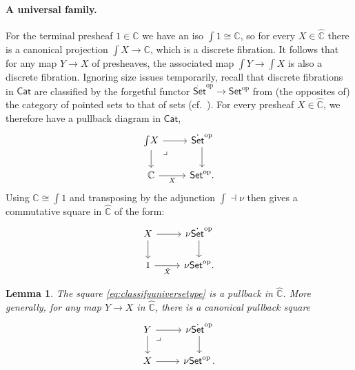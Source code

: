 \documentclass[12pt]{article}
\newcommand{\bbC}{\ensuremath{\mathbb{C}}}
\newcommand{\Set}{\ensuremath{\mathsf{Set}}}
\newcommand{\Cat}{\ensuremath{\mathsf{Cat}}}
\newcommand{\op}[1]{\ensuremath{{#1}^{\mathrm{op}}}}
\newcommand{\ra}{\ensuremath{\rightarrow}}
\renewcommand{\to}{\ensuremath{\rightarrow}}
\newcommand{\elem}[1]{\textstyle\int\!{#1}}
\newtheorem{lemma}[theorem]{Lemma}
\theoremstyle{remark}
\theoremstyle{definition}
\newcommand{\pbmark}{\ar[dr, phantom, "\lrcorner" very near start, shift right=.5ex]}	%
\begin{document}
\paragraph{A universal family.}

For the terminal presheaf $1\in\widehat{\bbC}$ we have an iso $\elem{1} \cong\bbC$, so for every $X\in\widehat{\bbC}$ there is a canonical projection  $\elem X \ra\bbC$, which is a discrete fibration.  It follows that for any map $Y\to X$ of presheaves, the associated map $\elem Y \to \elem X$ is also a discrete fibration. 
Ignoring size issues temporarily, recall that discrete fibrations in $\Cat$ are classified by the forgetful functor $\op{\dot{\Set}}\to \op{\Set}$ from (the opposites of) the category of pointed sets to that of sets (cf.~\cite{W:2007}).  For every presheaf $X\in\widehat{\bbC}$, we therefore have a pullback diagram in $\Cat$,
\begin{equation}\label{eq:classifyuniversecat}\textstyle
\begin{tikzcd}
	 \elem X \ar[d] \ar[r] \pbmark & \op{\dot{\Set}} \ar[d]\\  
	\bbC \ar[r,swap,"X"] &  \op{\Set}.
 \end{tikzcd}
 \end{equation}
Using $\bbC\cong\elem{1}$ and transposing by the adjunction $\int \dashv \nu$ then gives a commutative square in $\widehat{\bbC}$ of the form:
\begin{equation}\label{eq:classifyuniversetype}\textstyle
\begin{tikzcd}
	 X \ar[d] \ar[r] & \nu\op{\dot{\Set}} \ar[d]\\  
	1 \ar[r,swap,"\tilde{X}"] &  \nu\op{\Set}.
 \end{tikzcd}
 \end{equation}

\begin{lemma}
The square \eqref{eq:classifyuniversetype} is a pullback in $\widehat{\bbC}$. More generally, for any map $Y\ra X$ in $\widehat{\bbC}$, there is a canonical pullback square 
\begin{equation}\label{eq:classifyuniversefamily}\textstyle
\begin{tikzcd}
	 Y \ar[d] \pbmark \ar[r] & \nu\op{\dot{\Set}} \ar[d] \\  
	X \ar[r] &  \nu\op{\Set}\,.
 \end{tikzcd}
 \end{equation}
\end{lemma}
\end{document}
